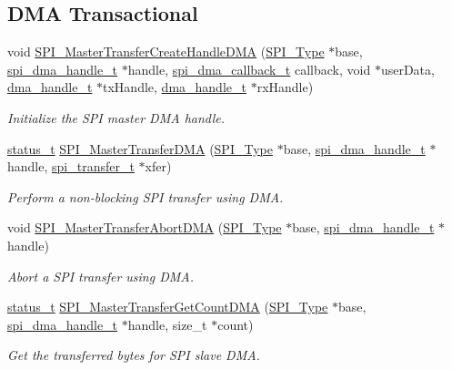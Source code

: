 \subsection*{D\+MA Transactional}
\begin{DoxyCompactItemize}
\item 
void \mbox{\hyperlink{group__spi__dma__driver_ga5e1c842943c46c7daf3d6ecd99fe8681}{S\+P\+I\+\_\+\+Master\+Transfer\+Create\+Handle\+D\+MA}} (\mbox{\hyperlink{struct_s_p_i___type}{S\+P\+I\+\_\+\+Type}} $\ast$base, \mbox{\hyperlink{struct__spi__dma__handle}{spi\+\_\+dma\+\_\+handle\+\_\+t}} $\ast$handle, \mbox{\hyperlink{group__spi__dma__driver_gacbd157eee3bc09fe3156002bf242d15f}{spi\+\_\+dma\+\_\+callback\+\_\+t}} callback, void $\ast$user\+Data, \mbox{\hyperlink{group__dma_gac4a65788d7e5762d16a41a50b2cd7956}{dma\+\_\+handle\+\_\+t}} $\ast$tx\+Handle, \mbox{\hyperlink{group__dma_gac4a65788d7e5762d16a41a50b2cd7956}{dma\+\_\+handle\+\_\+t}} $\ast$rx\+Handle)
\begin{DoxyCompactList}\small\item\em Initialize the S\+PI master D\+MA handle. \end{DoxyCompactList}\item 
\mbox{\hyperlink{group__ksdk__common_gaaabdaf7ee58ca7269bd4bf24efcde092}{status\+\_\+t}} \mbox{\hyperlink{group__spi__dma__driver_ga2bcf43f1d6908810b6b41d2d87bda3a9}{S\+P\+I\+\_\+\+Master\+Transfer\+D\+MA}} (\mbox{\hyperlink{struct_s_p_i___type}{S\+P\+I\+\_\+\+Type}} $\ast$base, \mbox{\hyperlink{struct__spi__dma__handle}{spi\+\_\+dma\+\_\+handle\+\_\+t}} $\ast$handle, \mbox{\hyperlink{group__spi__driver_ga59314d5596f240cfbe8b9466bd99ed3f}{spi\+\_\+transfer\+\_\+t}} $\ast$xfer)
\begin{DoxyCompactList}\small\item\em Perform a non-\/blocking S\+PI transfer using D\+MA. \end{DoxyCompactList}\item 
void \mbox{\hyperlink{group__spi__dma__driver_gac5f2aabca472a57709db2ef153e031c8}{S\+P\+I\+\_\+\+Master\+Transfer\+Abort\+D\+MA}} (\mbox{\hyperlink{struct_s_p_i___type}{S\+P\+I\+\_\+\+Type}} $\ast$base, \mbox{\hyperlink{struct__spi__dma__handle}{spi\+\_\+dma\+\_\+handle\+\_\+t}} $\ast$handle)
\begin{DoxyCompactList}\small\item\em Abort a S\+PI transfer using D\+MA. \end{DoxyCompactList}\item 
\mbox{\hyperlink{group__ksdk__common_gaaabdaf7ee58ca7269bd4bf24efcde092}{status\+\_\+t}} \mbox{\hyperlink{group__spi__dma__driver_ga642d1fe963b7f1c28e5d8f4dd5b92861}{S\+P\+I\+\_\+\+Master\+Transfer\+Get\+Count\+D\+MA}} (\mbox{\hyperlink{struct_s_p_i___type}{S\+P\+I\+\_\+\+Type}} $\ast$base, \mbox{\hyperlink{struct__spi__dma__handle}{spi\+\_\+dma\+\_\+handle\+\_\+t}} $\ast$handle, size\+\_\+t $\ast$count)
\begin{DoxyCompactList}\small\item\em Get the transferred bytes for S\+PI slave D\+MA. \end{DoxyCompactList}\end{DoxyCompactItemize}


